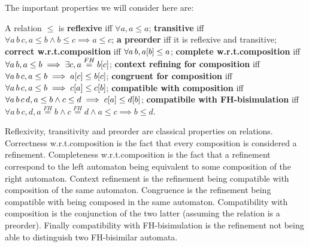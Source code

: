 \documentclass{article}
\begin{document}

The important properties we will consider here are:
\begin{defi} A relation \(\leq\) is
 \textbf{reflexive} iff \(\forall a, a \leq a\);
 \textbf{transitive} iff \(\forall a\, b\, c, a \leq b \wedge b \leq c \implies a \leq c\);
 \textbf{a preorder} iff it is reflexive and transitive;
 \textbf{correct w.r.t.\@ composition} iff \(\forall a\, b, a{\left[b\right]} \leq a\);
 \textbf{complete w.r.t.\@ composition} iff \(\forall a\, b, a \leq b \implies \exists c, a \overset{FH}= b{\left[c\right]}\);
 \textbf{context refining for composition} iff \(\forall a\, b\, c, a \leq b \implies a{\left[c\right]} \leq b{\left[c\right]}\);
 \textbf{congruent for composition} iff \(\forall a\, b\, c, a \leq b \implies c{\left[a\right]} \leq c{\left[b\right]}\);
 \textbf{compatible with composition} iff \(\forall a\, b\, c\, d, a \leq b \wedge c \leq d \implies c{\left[a\right]} \leq d{\left[b\right]}\);
 \textbf{compatibile with FH-bisimulation} iff \(\forall a\, b\, c, d, a \overset{FH}= b \wedge c \overset{FH}= d \wedge a \leq c \implies b \leq d\).
\end{defi}
Reflexivity, transitivity and preorder are classical properties on relations.
Correctness w.r.t.\@ composition is the fact that every composition is considered a refinement.
Completeness w.r.t.\@ composition is the fact that a refinement correspond to the left automaton being equivalent to some composition of the right automaton.
Context refinement is the refinement being compatible with composition of the same automaton.
Congruence is the refinement being compatible with being composed in the same automaton.
Compatibility with composition is the conjunction of the two latter (assuming the relation is a preorder).
Finally compatibility with FH-bisimulation is the refinement not being able to distinguish two FH-bisimilar automata.
\end{document}
